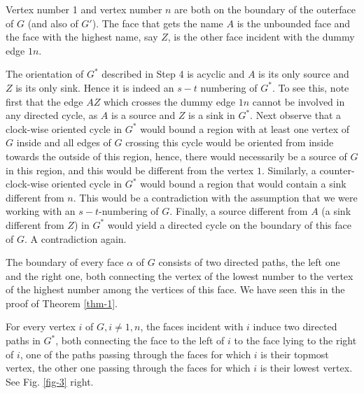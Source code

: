 \begin{claim}
	Vertex number 1 and vertex number $n$ are both on the boundary of the outerface of $G$ (and also of $G'$). The face that gets the name $A$ is the unbounded face and the face with the highest name, say $Z$, is the other face incident with the dummy edge $1n$.
\end{claim}

\begin{claim}
	The orientation of $G^\ast$ described in Step 4 is acyclic and $A$ is its only source and $Z$ is its only sink. Hence it is indeed an $s - t$ numbering of $G^\ast$. To see this, note first that the edge $AZ$ which crosses the dummy edge $1n$ cannot be involved in any directed cycle, as $A$ is a source and $Z$ is a sink in $G^\ast$. Next observe that a clock-wise oriented cycle in $G^\ast$ would bound a region with at least one vertex of $G$ inside and all edges of $G$ crossing this cycle would be oriented from inside towards the outside of this region, hence, there would necessarily be a source of $G$ in this region, and this would be different from the vertex $1$. Similarly, a counter-clock-wise oriented cycle in $G^\ast$ would bound a region that would contain a sink different from $n$. This would be a contradiction with the assumption that we were working with an $s - t$-numbering of $G$. Finally, a source different from $A$ (a sink different from $Z$) in $G^\ast$ would yield a directed cycle on the boundary of this face of $G$. A contradiction again.
\end{claim}

\begin{claim}
	The boundary of every face $\alpha$ of $G$ consists of two directed paths, the left one and the right one, both connecting the vertex of the lowest number to the vertex of the highest number among the vertices of this face. We have seen this in the proof of Theorem \ref{thm-1}.
\end{claim}

\begin{claim}
	For every vertex $i$ of $G, i \neq 1, n$, the faces incident with $i$ induce two directed paths in $G^\ast$,
	both connecting the face to the left of $i$ to the face lying to the right of $i$, one of the paths passing
	through the faces for which $i$ is their topmost vertex, the other one passing through the faces for which
	$i$ is their lowest vertex. See Fig. \ref{fig-3} right.
\end{claim}

